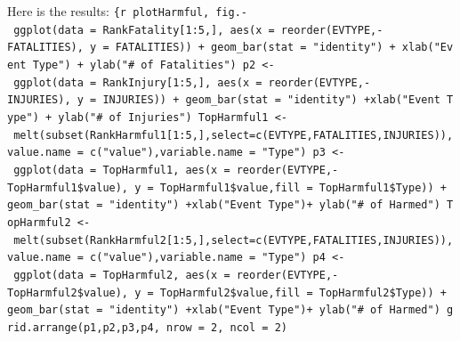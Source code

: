 \documentclass[]{article}
\newenvironment{Shaded}{\begin{snugshade}}{\end{snugshade}}
\newcommand{\KeywordTok}[1]{\textcolor[rgb]{0.13,0.29,0.53}{\textbf{#1}}}
\newcommand{\DataTypeTok}[1]{\textcolor[rgb]{0.13,0.29,0.53}{#1}}
\newcommand{\DecValTok}[1]{\textcolor[rgb]{0.00,0.00,0.81}{#1}}
\newcommand{\StringTok}[1]{\textcolor[rgb]{0.31,0.60,0.02}{#1}}
\newcommand{\OperatorTok}[1]{\textcolor[rgb]{0.81,0.36,0.00}{\textbf{#1}}}
\newcommand{\NormalTok}[1]{#1}
\begin{document}
Here is the results:
\texttt{\{r\ plotHarmful,\ fig.-\ ggplot(data\ =\ RankFatality{[}1:5,{]},\ aes(x\ =\ reorder(EVTYPE,-FATALITIES),\ y\ =\ FATALITIES))\ +\ geom\_bar(stat\ =\ "identity")\ +\ xlab("Event\ Type")\ +\ ylab("\#\ of\ Fatalities")\ p2\ \textless{}-\ ggplot(data\ =\ RankInjury{[}1:5,{]},\ aes(x\ =\ reorder(EVTYPE,-INJURIES),\ y\ =\ INJURIES))\ +\ geom\_bar(stat\ =\ "identity")\ +xlab("Event\ Type")\ +\ ylab("\#\ of\ Injuries")\ TopHarmful1\ \textless{}-\ melt(subset(RankHarmful1{[}1:5,{]},select=c(EVTYPE,FATALITIES,INJURIES)),value.name\ =\ c("value"),variable.name\ =\ "Type")\ p3\ \textless{}-\ ggplot(data\ =\ TopHarmful1,\ aes(x\ =\ reorder(EVTYPE,-TopHarmful1\$value),\ y\ =\ TopHarmful1\$value,fill\ =\ TopHarmful1\$Type))\ +\ geom\_bar(stat\ =\ "identity")\ +xlab("Event\ Type")+\ ylab("\#\ of\ Harmed")\ TopHarmful2\ \textless{}-\ melt(subset(RankHarmful2{[}1:5,{]},select=c(EVTYPE,FATALITIES,INJURIES)),value.name\ =\ c("value"),variable.name\ =\ "Type")\ p4\ \textless{}-\ ggplot(data\ =\ TopHarmful2,\ aes(x\ =\ reorder(EVTYPE,-TopHarmful2\$value),\ y\ =\ TopHarmful2\$value,fill\ =\ TopHarmful2\$Type))\ +\ geom\_bar(stat\ =\ "identity")\ +xlab("Event\ Type")+\ ylab("\#\ of\ Harmed")\ grid.arrange(p1,p2,p3,p4,\ nrow\ =\ 2,\ ncol\ =\ 2)}

\begin{Shaded}
\end{Shaded}
\end{document}
